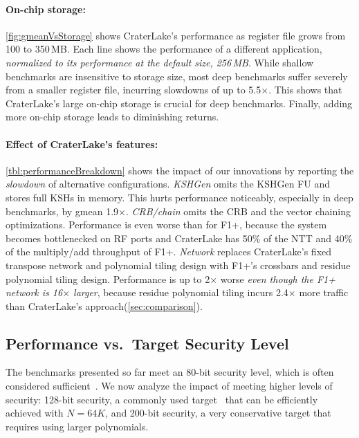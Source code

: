 \figGmeanVsStorage

\paragraph{On-chip storage:}
\autoref{fig:gmeanVsStorage} shows CraterLake's performance as register file
grows from 100 to 350\,MB. Each line shows the performance of a different
application, \emph{normalized to its performance at the default size, 256\,MB}.
While shallow benchmarks are insensitive to storage size, most deep benchmarks
suffer severely from a smaller register file, incurring slowdowns of up to
5.5$\times$. This shows that CraterLake's large on-chip storage is crucial for
deep benchmarks. Finally, adding more on-chip storage leads to diminishing
returns.


\paragraph{Effect of CraterLake's features:}
\autoref{tbl:performanceBreakdown} shows the impact of our innovations by
reporting the \emph{slowdown} of alternative configurations. \emph{KSHGen}
omits the KSHGen FU and stores full KSHs in memory. This hurts performance
noticeably, especially in deep benchmarks, by gmean 1.9$\times$.
\emph{CRB/chain} omits the CRB and the vector chaining optimizations.
Performance is even worse than for F1+, because the system becomes bottlenecked
on RF ports and CraterLake has 50\% of the NTT and 40\% of the multiply/add
throughput of F1+. \emph{Network} replaces CraterLake's fixed transpose network
and polynomial tiling design with F1+'s crossbars and residue polynomial tiling
design. Performance is up to 2$\times$ worse \emph{even though the F1+ network
is 16$\times$ larger}, because residue polynomial tiling incurs 2.4$\times$
more traffic than CraterLake's approach(\autoref{sec:comparison}).

\subsection{Performance vs.\ Target Security Level}
\label{sec:moreSecurity}

The benchmarks presented so far meet an 80-bit security level, which is often
considered
sufficient~\cite{feldmann:micro21:f1,halevi2021bootstrapping,halevi2018faster,izabachene2019practical,ji2019efficient}.
We now analyze the impact of meeting higher levels of security: 128-bit
security, a commonly used
target~\cite{albrecht:hesg18:standard,lee:2021:privacy,riazi:asplos20:heax}
that can be efficiently achieved with $N =64K$, and 200-bit security, a very
conservative target that requires using larger polynomials.

